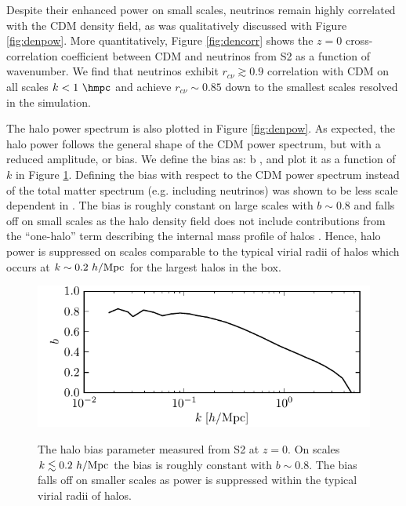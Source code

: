 Despite their enhanced power on small scales, neutrinos remain highly correlated with the CDM density field, as was qualitatively discussed with Figure \ref{fig:denpow}.  More quantitatively, Figure \ref{fig:dencorr} shows the $z = 0$ cross-correlation coefficient between CDM and neutrinos from S2 as a function of wavenumber. We find that neutrinos exhibit $r_{c\nu} \gtrsim 0.9$ correlation with CDM on all scales $k < 1\ \hmpc$ and achieve $r_{c\nu} \sim 0.85$ down to the smallest scales resolved in the simulation.

The halo power spectrum is also plotted in Figure \ref{fig:denpow}. As expected, the halo power follows the general shape of the CDM power spectrum, but with a reduced amplitude, or bias.  We define the bias as:
\bq
b \equiv {},
\label{eq:bias}
\eq
and plot it as a function of $k$ in Figure \ref{fig:denbias}. Defining the bias with respect to the CDM power spectrum instead of the total matter spectrum (e.g. including neutrinos) was shown to be less scale dependent in \citet{castorina/etal:2014}. The bias is roughly constant on large scales with $b \sim 0.8$ and falls off on small scales as the halo density field does not include contributions from the ``one-halo'' term describing the internal mass profile of halos \citep{scherrer/bertschinger:1991}. Hence, halo power is suppressed on scales comparable to the typical virial radii of halos which occurs at $k \sim 0.2\ h/{\rm Mpc}$ for the largest halos in the box.

\begin{figure}[!t]
\begin{center}
\includegraphics[width=\smwidth]{./figures/neutrinos/fig4.pdf} \vspace{-0.1cm}
\caption[Halo bias scale dependence]
{The halo bias parameter measured from S2 at $z = 0$.
On scales $k \lesssim 0.2\ h/{\rm Mpc}$ the bias is roughly
constant with $b \sim 0.8$. The bias falls off on smaller
scales as power is suppressed within the typical virial
radii of halos.}
\vspace{-0.2cm}
\label{fig:denbias}
\end{center}
\end{figure}

